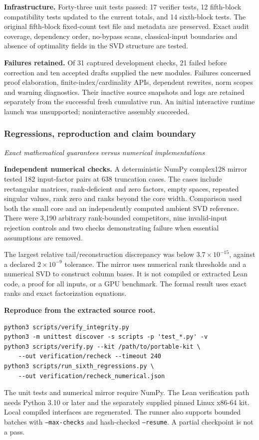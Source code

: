 \textbf{Infrastructure.} Forty-three unit tests passed: 17 verifier tests, 12 fifth-block compatibility tests updated to the current totals, and 14 sixth-block tests. The original fifth-block fixed-count test file and metadata are preserved. Exact audit coverage, dependency order, no-bypass scans, classical-input boundaries and absence of optimality fields in the SVD structure are tested.

\textbf{Failures retained.} Of 31 captured development checks, 21 failed before correction and ten accepted drafts supplied the new modules. Failures concerned proof elaboration, finite-index/cardinality APIs, dependent rewrites, norm scopes and warning diagnostics. Their inactive source snapshots and logs are retained separately from the successful fresh cumulative run. An initial interactive runtime launch was unsupported; noninteractive assembly succeeded.



\subsubsection*{Regressions, reproduction and claim boundary}\label{history:supp6:subsection:007}\textit{Exact mathematical guarantees versus numerical implementations}\par
\textbf{Independent numerical checks.} A deterministic NumPy complex128 mirror tested 182 input-factor pairs at 638 truncation cases. The cases include rectangular matrices, rank-deficient and zero factors, empty spaces, repeated singular values, rank zero and ranks beyond the core width. Comparison used both the small core and an independently computed ambient SVD reference. There were 3,190 arbitrary rank-bounded competitors, nine invalid-input rejection controls and two checks demonstrating failure when essential assumptions are removed.

The largest relative tail/reconstruction discrepancy was below $3.7\times10^{-15}$, against a declared $2\times10^{-9}$ tolerance. The mirror uses numerical rank thresholds and a numerical SVD to construct column bases. It is not compiled or extracted Lean code, a proof for all inputs, or a GPU benchmark. The formal result uses exact ranks and exact factorization equations.

\textbf{Reproduce from the extracted source root.}
\begin{verbatim}
python3 scripts/verify_integrity.py
python3 -m unittest discover -s scripts -p 'test_*.py' -v
python3 scripts/verify.py --kit /path/to/portable-kit \
    --out verification/recheck --timeout 240
python3 scripts/run_sixth_regressions.py \
    --out verification/recheck_numerical.json
\end{verbatim}
The unit tests and numerical mirror require NumPy. The Lean verification path needs Python 3.10 or later and the separately supplied pinned Linux x86-64 kit. Local compiled interfaces are regenerated. The runner also supports bounded batches with \texttt{--max-checks} and hash-checked \texttt{--resume}. A partial checkpoint is not a pass.

